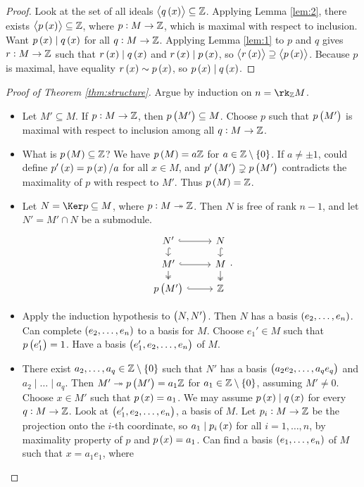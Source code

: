 \pagebreak

\begin{proof}
Look at the set of all ideals $ \abr{q\br{x}} \subseteq \ZZ $. Applying Lemma \ref{lem:2}, there exists $ \abr{p\br{x}} \subseteq \ZZ $, where $ p : M \to \mathbb{Z} $, which is maximal with respect to inclusion. Want $ p\br{x} \mid q\br{x} $ for all $ q : M \to \mathbb{Z} $. Applying Lemma \ref{lem:1} to $ p $ and $ q $ gives $ r : M \to \mathbb{Z} $ such that $ r\br{x} \mid q\br{x} $ and $ r\br{x} \mid p\br{x} $, so $ \abr{r\br{x}} \supseteq \abr{p\br{x}} $. Because $ p $ is maximal, have equality $ r\br{x} \sim p\br{x} $, so $ p\br{x} \mid q\br{x} $.
\end{proof}

\begin{proof}[Proof of Theorem \ref{thm:structure}]
Argue by induction on $ n = \rk_\ZZ M $.
\begin{itemize}
\item Let $ M' \subseteq M $. If $ p : M \to \mathbb{Z} $, then $ p\br{M'} \subseteq M $. Choose $ p $ such that $ p\br{M'} $ is maximal with respect to inclusion among all $ q : M \to \mathbb{Z} $.
\item What is $ p\br{M} \subseteq \ZZ $? We have $ p\br{M} = a\ZZ $ for $ a \in \ZZ \setminus \cbr{0} $. If $ a \ne \pm 1 $, could define $ p'\br{x} = p\br{x} / a $ for all $ x \in M $, and $ p'\br{M'} \supsetneq p\br{M'} $ contradicts the maximality of $ p $ with respect to $ M' $. Thus $ p\br{M} = \ZZ $.
\item Let $ N = \Ker p \subseteq M $, where $ p : M \twoheadrightarrow \mathbb{Z} $. Then $ N $ is free of rank $ n - 1 $, and let $ N' = M' \cap N $ be a submodule.
$$
\begin{tikzcd}[row sep=small]
N' \arrow[hookrightarrow]{r} \arrow[hookrightarrow]{d} & N \arrow[hookrightarrow]{d} \\
M' \arrow[hookrightarrow]{r} \arrow[twoheadrightarrow]{d} & M \arrow[twoheadrightarrow]{d} \\
p\br{M'} \arrow[hookrightarrow]{r} & \ZZ
\end{tikzcd}.
$$
\item Apply the induction hypothesis to $ \br{N, N'} $. Then $ N $ has a basis $ \br{e_2, \dots, e_n} $. Can complete $ \br{e_2, \dots, e_n} $ to a basis for $ M $. Choose $ e_1' \in M $ such that $ p\br{e_1'} = 1 $. Have a basis $ \br{e_1', e_2, \dots, e_n} $ of $ M $.
\item There exist $ a_2, \dots, a_q \in \ZZ \setminus \cbr{0} $ such that $ N' $ has a basis $ \br{a_2e_2, \dots, a_qe_q} $ and $ a_2 \mid \dots \mid a_q $. Then $ M' \twoheadrightarrow p\br{M'} = a_1\ZZ $ for $ a_1 \in \ZZ \setminus \cbr{0} $, assuming $ M' \ne 0 $. Choose $ x \in M' $ such that $ p\br{x} = a_1 $. We may assume $ p\br{x} \mid q\br{x} $ for every $ q : M \to \mathbb{Z} $. Look at $ \br{e_1', e_2, \dots, e_n} $, a basis of $ M $. Let $ p_i : M \to \mathbb{Z} $ be the projection onto the $ i $-th coordinate, so $ a_1 \mid p_i\br{x} $ for all $ i = 1, \dots, n $, by maximality property of $ p $ and $ p\br{x} = a_1 $. Can find a basis $ \br{e_1, \dots, e_n} $ of $ M $ such that $ x = a_1e_1 $, where

\end{itemize}
\end{proof}
